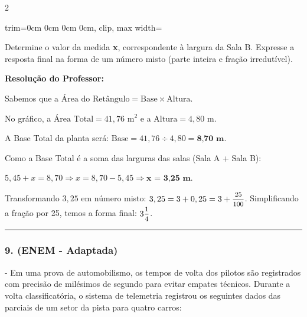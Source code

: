 \begin{multicols*}{2}
\begin{center}
\begin{adjustbox}{trim=0cm 0cm 0cm 0cm, clip, max width=\larguraTikz}
\end{adjustbox}
\end{center}

Determine o valor da medida \textbf{x}, correspondente à largura da Sala B. Expresse a resposta final na forma de um número misto (parte inteira e fração irredutível).

\ifgabarito
    \begin{tcolorbox}[colback=CorTitUm!5, colframe=CorTitUm, boxrule=1pt, arc=4pt, left=6pt, right=6pt, top=6pt, bottom=6pt]
    \small\textbf{\textcolor{CorTitUm}{Resolução do Professor:}}\par\vspace{0.1cm}
    \color{CinzaEscuro}
    Sabemos que a $\text{Área do Retângulo} = \text{Base} \times \text{Altura}$. 
    
    No gráfico, a $\text{Área Total} = 41,76 \text{ m}^2$ e a $\text{Altura} = 4,80 \text{ m}$.
    
    A Base Total da planta será: $\text{Base} = 41,76 \div 4,80 = \textbf{8,70 m}$.
    
    Como a Base Total é a soma das larguras das salas (Sala A + Sala B):
    
    $5,45 + x = 8,70 \Rightarrow x = 8,70 - 5,45 \Rightarrow \textbf{x = 3,25 m}$.
    
    Transformando $3,25$ em número misto: $3,25 = 3 + 0,25 = 3 + \mfrac{25}{100}$. Simplificando a fração por 25, temos a forma final: $3\mfrac{1}{4}$.
    \end{tcolorbox}
\fi

\par\vspace{\espacoQuestao}

\noindent\textcolor{CorLinha}{\rule{\linewidth}{0.5pt}} 
\par\vspace{\espacoPreQuestao}
\subsubsection*{9. (ENEM - Adaptada)} - Em uma prova de automobilismo, os tempos de volta dos pilotos são registrados com precisão de milésimos de segundo para evitar empates técnicos. Durante a volta classificatória, o sistema de telemetria registrou os seguintes dados das parciais de um setor da pista para quatro carros:


\end{multicols*}
